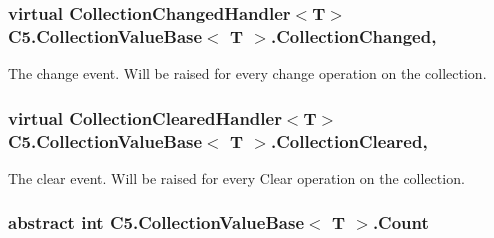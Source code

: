 \hypertarget{class_c5_1_1_collection_value_base_aba529af0877c1621812c2cc20e6dc7d9}{}
\subsubsection[{Collection\+Changed}]{\setlength{\rightskip}{0pt plus 5cm}virtual Collection\+Changed\+Handler$<$T$>$ {\bf C5.\+Collection\+Value\+Base}$<$ T $>$.Collection\+Changed\hspace{0.3cm}{\ttfamily [add]}, {\ttfamily [remove]}}\label{class_c5_1_1_collection_value_base_aba529af0877c1621812c2cc20e6dc7d9}


The change event. Will be raised for every change operation on the collection. 

\hypertarget{class_c5_1_1_collection_value_base_ac3a3ee8103dbad9a0e647ef1a94bcf1f}{}
\subsubsection[{Collection\+Cleared}]{\setlength{\rightskip}{0pt plus 5cm}virtual Collection\+Cleared\+Handler$<$T$>$ {\bf C5.\+Collection\+Value\+Base}$<$ T $>$.Collection\+Cleared\hspace{0.3cm}{\ttfamily [add]}, {\ttfamily [remove]}}\label{class_c5_1_1_collection_value_base_ac3a3ee8103dbad9a0e647ef1a94bcf1f}


The clear event. Will be raised for every Clear operation on the collection. 

\hypertarget{class_c5_1_1_collection_value_base_ac27de36f8fcd6bd3c66ce04768adfe1e}{}
\subsubsection[{Count}]{\setlength{\rightskip}{0pt plus 5cm}abstract int {\bf C5.\+Collection\+Value\+Base}$<$ T $>$.Count\hspace{0.3cm}{\ttfamily [get]}}\label{class_c5_1_1_collection_value_base_ac27de36f8fcd6bd3c66ce04768adfe1e}


